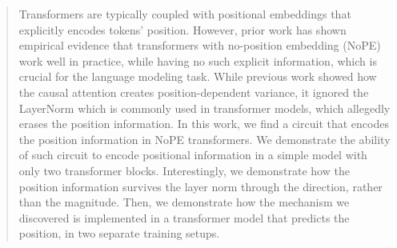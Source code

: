\documentclass{article}
\theoremstyle{plain}
\theoremstyle{definition}
\theoremstyle{remark}
\begin{document}
\begin{abstract}

Transformers are typically coupled with positional embeddings that explicitly encodes tokens' position. However, prior work has shown empirical evidence that transformers with no-position embedding (NoPE) work well in practice, while having no such explicit information, which is crucial for the language modeling task.
While previous work showed how the causal attention creates position-dependent variance, it ignored the LayerNorm which is commonly used in transformer models, which allegedly erases the position information.
In this work, we find a circuit that encodes the position information in NoPE transformers. We demonstrate the ability of such circuit to encode positional information in a simple model with only two transformer blocks. Interestingly, we demonstrate how the position information survives the layer norm through the direction, rather than the magnitude.
Then, we demonstrate how the mechanism we discovered is implemented in a transformer model that predicts the position, in two separate training setups.




\end{abstract}
\end{document}
